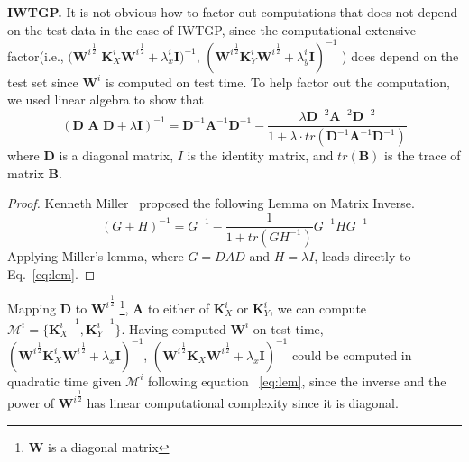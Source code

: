 \textbf{IWTGP. } It is not obvious how to factor out computations that does not depend on the test data in the case of IWTGP, since the computational extensive factor(i.e., $({\textbf{W}^i}^\frac{1}{2} $ $\textbf{K}_X^i {\textbf{W}^i}^\frac{1}{2} + \lambda_x^i \textbf{I})^{-1}$,  $({\textbf{W}^i}^\frac{1}{2} \textbf{K}_Y^i {\textbf{W}^i}^\frac{1}{2} + \lambda_y^i \textbf{I})^{-1}$ ) does depend on the test set since $\textbf{W}^i$ is computed on test time.  To help factor out the computation, we used linear algebra to show that
\begin{equation}
(\textbf{D A D} + \lambda \textbf{I})^{-1} =   \textbf{D}^{-1} \textbf{A}^{-1} \textbf{D}^{-1} - \frac{\lambda \textbf{D}^{-2} \textbf{A}^{-2} \textbf{D}^{-2}} {1 + \lambda \cdot  tr(\textbf{D}^{-1} \textbf{A}^{-1} \textbf{D}^{-1})}
\label{eq:lem}
\end{equation}
where $\textbf{D}$ is a diagonal matrix,  $I$ is the identity matrix, and $tr(\textbf{B})$ is the trace of matrix $\textbf{B}$.  \begin{proof}
Kenneth Miller~\cite{Miller1981} proposed the following Lemma on Matrix Inverse. 
 \begin{equation}
 (G+H)^{-1} = G^{-1} -\frac{1}{1+tr(G H^{-1})} G^{-1} H G^{-1} 
 \end{equation}
  Applying Miller's lemma, where  $G = D A D$ and $H = \lambda I$, leads directly to Eq.~\ref{eq:lem}. %
 \end{proof}
 




Mapping $\textbf{D}$ to ${\textbf{W}^i}^\frac{1}{2}$ \footnote{$\textbf{W}$ is a diagonal matrix}, $\textbf{A}$ to either of $\textbf{K}_X^i$ or $\textbf{K}_Y^i$, we can compute $\mathcal{M}^i = \{{\textbf{K}_X^i}^{-1}, {\textbf{K}_Y^i}^{-1}\}$. Having computed $\textbf{W}^i$ on test time,  $({\textbf{W}^i}^\frac{1}{2} \textbf{K}_X^i {\textbf{W}^i}^\frac{1}{2} + \lambda_x \textbf{I})^{-1}$,  $({{\textbf{W}^i}}^\frac{1}{2} \textbf{K}_X {\textbf{W}^i}^\frac{1}{2} + \lambda_x \textbf{I})^{-1}$ could be computed in quadratic time given  $\mathcal{M}^i$  following equation ~\ref{eq:lem}, since the inverse and the power of ${\textbf{W}^i}^\frac{1}{2}$ has linear computational complexity since it is diagonal. 

